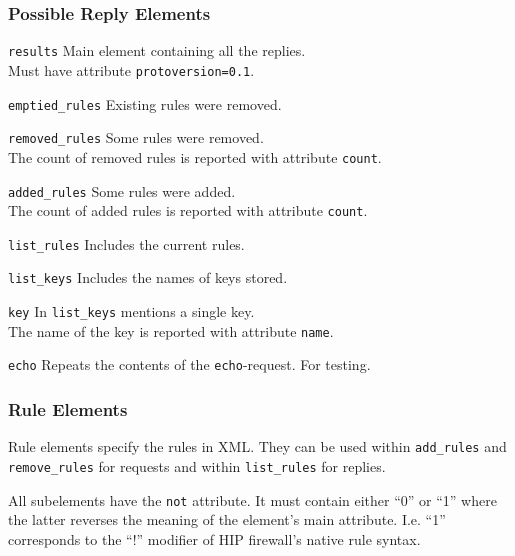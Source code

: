 \documentclass[a4paper,titlepage]{article}
\begin{document}
\subsubsection*{Possible Reply Elements}

\begin{description}
\item \texttt{results} Main element containing all the replies. \\
	Must have attribute \texttt{protoversion=0.1}.
\item \texttt{emptied\_rules} Existing rules were removed.
\item \texttt{removed\_rules} Some rules were removed. \\
	The count of removed rules is reported with attribute \texttt{count}.
\item \texttt{added\_rules} Some rules were added. \\
	The count of added rules is reported with attribute \texttt{count}.
\item \texttt{list\_rules} Includes the current rules.
\item \texttt{list\_keys} Includes the names of keys stored.
\item \texttt{key} In \texttt{list\_keys} mentions a single key. \\
	The name of the key is reported with attribute \texttt{name}.
\item \texttt{echo} Repeats the contents of the \texttt{echo}-request. For testing.
\end{description}

\subsubsection*{Rule Elements}

Rule elements specify the rules in XML. They can be used within
\texttt{add\_rules} and \texttt{remove\_rules} for requests and within
\texttt{list\_rules} for replies.

All subelements have the \texttt{not} attribute. It must contain
either ``0'' or ``1'' where the latter reverses the meaning of the
element's main attribute. I.e. ``1'' corresponds to the ``!'' modifier
of HIP firewall's native rule syntax.
\end{document}
